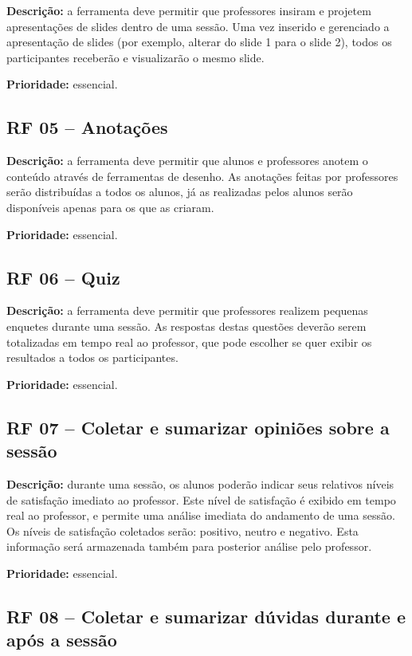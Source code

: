 \textbf{Descrição:} a ferramenta deve permitir que professores insiram e projetem apresentações de slides dentro de uma sessão. Uma vez inserido e gerenciado a apresentação de slides (por exemplo, alterar do slide 1 para o slide 2), todos os participantes receberão e visualizarão o mesmo slide.

\textbf{Prioridade:} essencial.

\subsection{RF 05 – Anotações}

\textbf{Descrição:} a ferramenta deve permitir que alunos e professores anotem o conteúdo através de ferramentas de desenho. As anotações feitas por professores serão distribuídas a todos os alunos, já as realizadas pelos alunos serão disponíveis apenas para os que as criaram.

\textbf{Prioridade:} essencial.

\subsection{RF 06 – Quiz}

\textbf{Descrição:} a ferramenta deve permitir que professores realizem pequenas enquetes durante uma sessão. As respostas destas questões deverão serem totalizadas em tempo real ao professor, que pode escolher se quer exibir os resultados a todos os participantes.

\textbf{Prioridade:} essencial.

\subsection{RF 07 – Coletar e sumarizar opiniões sobre a sessão}

\textbf{Descrição:} durante uma sessão, os alunos poderão indicar seus relativos níveis de satisfação imediato ao professor. Este nível de satisfação é exibido em tempo real ao professor, e permite uma análise imediata do andamento de uma sessão. Os níveis de satisfação coletados serão: positivo, neutro e negativo. Esta informação será armazenada também para posterior análise pelo professor.

\textbf{Prioridade:} essencial.

\subsection{RF 08 – Coletar e sumarizar dúvidas durante e após a sessão}

